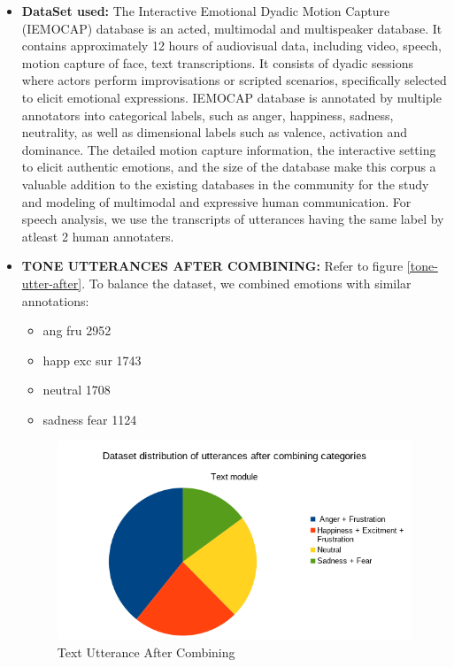 \documentclass[oneside,a4paper,12pt]{report}
\begin{document}
\begin{normalsize}
\begin{itemize}
	\begin{itemize}
			\item \textbf{DataSet used:} \newline
		\hspace{15mm}The Interactive Emotional Dyadic Motion Capture (IEMOCAP) database is an acted, multimodal and multispeaker database. It contains approximately 12 hours of audiovisual data, including video, speech, motion capture of face, text transcriptions. It consists of dyadic sessions where actors perform improvisations or scripted scenarios, specifically selected to elicit emotional expressions. IEMOCAP database is annotated by multiple annotators into categorical labels, such as anger, happiness, sadness, neutrality, as well as dimensional labels such as valence, activation and dominance. The detailed motion capture information, the interactive setting to elicit authentic emotions, and the size of the database make this corpus a valuable addition to the existing databases in the community for the study and modeling of multimodal and expressive human communication. For speech analysis, we use the transcripts of utterances having the same label by atleast 2 human annotaters.
			
			\vspace{5mm}
				\item \textbf{TONE UTTERANCES AFTER COMBINING:}
			Refer to figure \ref{tone-utter-after}. To balance the dataset, we combined emotions with similar annotations:
			\begin{itemize}
				\item 	ang fru 2952
				\item happ exc sur 1743
				\item neutral 1708
				\item sadness fear 1124
			\end{itemize}
		
			\begin{center}
			\begin{figure}[!htbp]
				\centering
				\includegraphics[width=\textwidth]{text-utterance-after-combining.png}
				\caption{Text Utterance After Combining}
				\label{fig:text-uttr-after-comb}
			\end{figure}
		\end{center} 
		

\end{itemize}
\end{itemize}
\end{normalsize}
\end{document}
